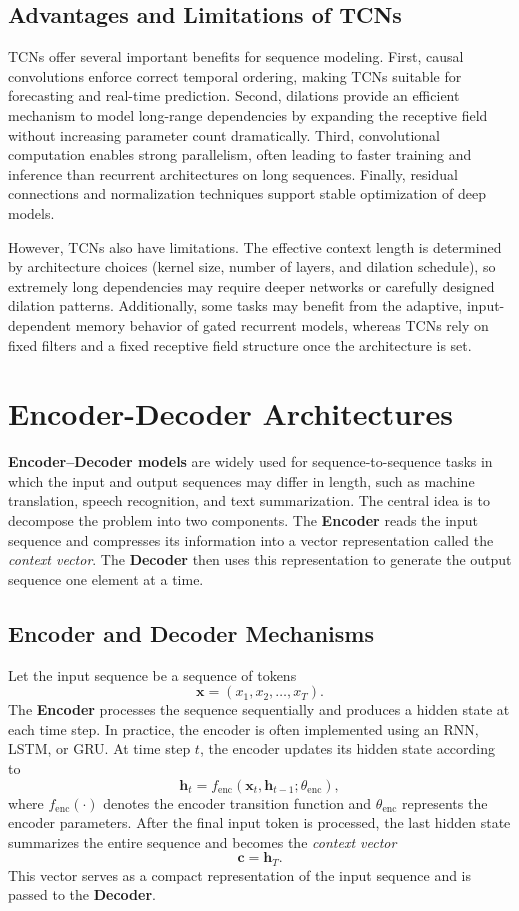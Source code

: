 \documentclass{article}
\begin{document}
\subsection{Advantages and Limitations of TCNs}

TCNs offer several important benefits for sequence modeling. First, causal convolutions enforce correct temporal ordering, making TCNs suitable for forecasting and real-time prediction. Second, dilations provide an efficient mechanism to model long-range dependencies by expanding the receptive field without increasing parameter count dramatically. Third, convolutional computation enables strong parallelism, often leading to faster training and inference than recurrent architectures on long sequences. Finally, residual connections and normalization techniques support stable optimization of deep models.

However, TCNs also have limitations. The effective context length is determined by architecture choices (kernel size, number of layers, and dilation schedule), so extremely long dependencies may require deeper networks or carefully designed dilation patterns. Additionally, some tasks may benefit from the adaptive, input-dependent memory behavior of gated recurrent models, whereas TCNs rely on fixed filters and a fixed receptive field structure once the architecture is set.

\section{Encoder-Decoder Architectures}

\textbf{Encoder--Decoder models} are widely used for sequence-to-sequence tasks in which the input and output sequences may differ in length, such as machine translation, speech recognition, and text summarization. The central idea is to decompose the problem into two components. The \textbf{Encoder} reads the input sequence and compresses its information into a vector representation called the \emph{context vector}. The \textbf{Decoder} then uses this representation to generate the output sequence one element at a time.

\subsection{Encoder and Decoder Mechanisms}

Let the input sequence be a sequence of tokens
\[
\mathbf{x} = (x_1, x_2, \dots, x_T).
\]
The \textbf{Encoder} processes the sequence sequentially and produces a hidden state at each time step. In practice, the encoder is often implemented using an RNN, LSTM, or GRU. At time step $t$, the encoder updates its hidden state according to
\[
\mathbf{h}_t = f_{\text{enc}}(\mathbf{x}_t, \mathbf{h}_{t-1}; \theta_{\text{enc}}),
\]
where $f_{\text{enc}}(\cdot)$ denotes the encoder transition function and $\theta_{\text{enc}}$ represents the encoder parameters. After the final input token is processed, the last hidden state summarizes the entire sequence and becomes the \emph{context vector}
\[
\mathbf{c} = \mathbf{h}_T.
\]
This vector serves as a compact representation of the input sequence and is passed to the \textbf{Decoder}.
\end{document}
